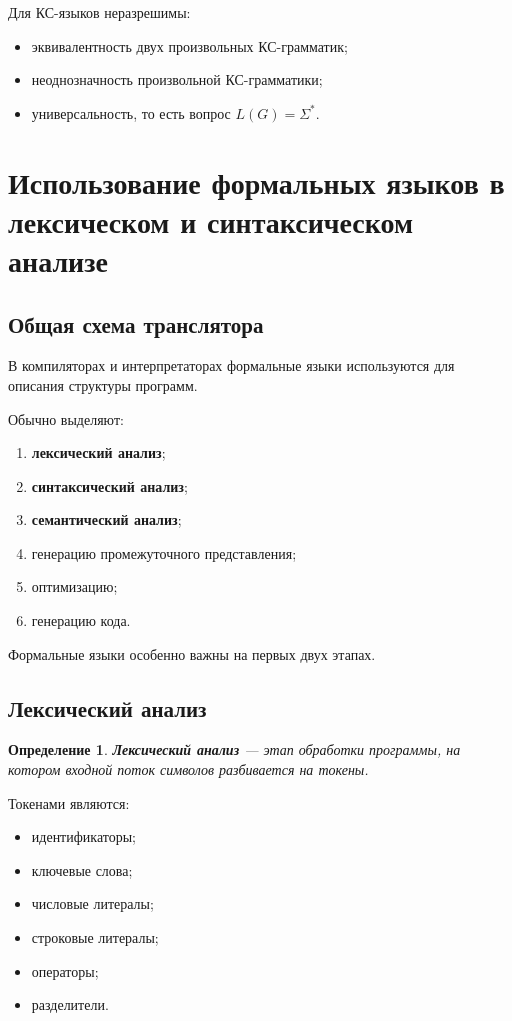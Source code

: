 \documentclass[12pt,a4paper]{article}
\newtheorem{definition}{Определение}
\begin{document}
Для КС-языков неразрешимы:
\begin{itemize}
    \item эквивалентность двух произвольных КС-грамматик;
    \item неоднозначность произвольной КС-грамматики;
    \item универсальность, то есть вопрос $L(G)=\Sigma^*$.
\end{itemize}

\section{Использование формальных языков в лексическом и синтаксическом анализе}

\subsection{Общая схема транслятора}

В компиляторах и интерпретаторах формальные языки используются для описания структуры программ.

Обычно выделяют:
\begin{enumerate}
    \item \textbf{лексический анализ};
    \item \textbf{синтаксический анализ};
    \item \textbf{семантический анализ};
    \item генерацию промежуточного представления;
    \item оптимизацию;
    \item генерацию кода.
\end{enumerate}

Формальные языки особенно важны на первых двух этапах.

\subsection{Лексический анализ}

\begin{definition}
\textbf{Лексический анализ} --- этап обработки программы, на котором входной поток символов разбивается на токены.
\end{definition}

Токенами являются:
\begin{itemize}
    \item идентификаторы;
    \item ключевые слова;
    \item числовые литералы;
    \item строковые литералы;
    \item операторы;
    \item разделители.
\end{itemize}
\end{document}
